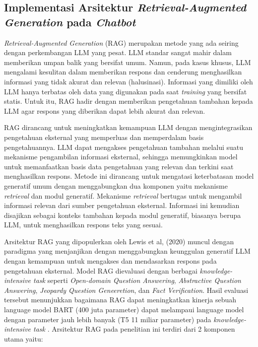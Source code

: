 \subsection{Implementasi Arsitektur \textit{Retrieval-Augmented Generation} pada \textit{Chatbot}}
\textit{Retrieval-Augmented Generation} (RAG) merupakan metode yang ada seiring dengan perkembangan LLM yang pesat.
LLM standar sangat mahir dalam memberikan umpan balik yang bersifat umum.
Namun, pada kasus khusus, LLM mengalami kesulitan dalam memberikan respons dan cenderung menghasilkan informasi yang tidak akurat dan relevan (halusinasi).
Informasi yang dimiliki oleh LLM hanya terbatas oleh data yang digunakan pada saat \textit{training} yang bersifat statis.
Untuk itu, RAG hadir dengan memberikan pengetahuan tambahan kepada LLM agar respons yang diberikan dapat lebih akurat dan relevan.

RAG dirancang untuk meningkatkan kemampuan LLM dengan mengintegrasikan pengetahuan eksternal yang memperluas dan memperdalam basis pengetahuannya.
LLM dapat mengakses pengetahuan tambahan melalui suatu mekanisme pengambilan informasi eksternal, sehingga memungkinkan model untuk memanfaatkan basis data pengetahuan yang relevan dan terkini saat menghasilkan respons.
Metode ini dirancang untuk mengatasi keterbatasan model generatif umum dengan menggabungkan dua komponen yaitu mekanisme \textit{retrieval} dan modul generatif.
Mekanisme \textit{retrieval} bertugas untuk mengambil informasi relevan dari sumber pengetahuan eksternal.
Informasi ini kemudian disajikan sebagai konteks tambahan kepada modul generatif, biasanya berupa LLM, untuk menghasilkan respons teks yang sesuai.

Arsitektur RAG yang dipopulerkan oleh Lewis et al, (2020) muncul dengan paradigma yang menjanjikan dengan menggabungkan keunggulan generatif LLM dengan kemampuan untuk mengakses dan mendasarkan respons pada pengetahuan eksternal.
Model RAG dievaluasi dengan berbagai \textit{knowledge-intensive task} seperti \textit{Open-domain Question Answering}, \textit{Abstractive Question Answering}, \textit{Jeopardy Question Geneeretion}, dan \textit{Fact Verification}.
Hasil evaluasi tersebut menunjukkan bagaimana RAG dapat meningkatkan kinerja sebuah language model BART (400 juta parameter) dapat melampaui language model dengan parameter jauh lebih banyak (T5 11 miliar parameter) pada \textit{knowledge-intensive task} \cite{Lewis2021RAGKnowledgeIntensiveNLP}.
Arsitektur RAG pada penelitian ini terdiri dari 2 komponen utama yaitu:

